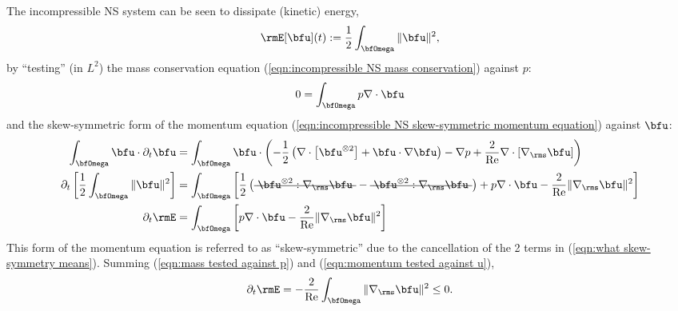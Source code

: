     The incompressible NS system can be seen to dissipate (kinetic) energy,
    \begin{equation}\label{eqn:incompressible NS energy definition}
        \rmE[\bfu](t)  :=  \frac{1}{2}\int_{\bfOmega}\|\bfu\|^{2},
    \end{equation}
    by ``testing'' (in $L^{2}$) the mass conservation equation (\ref{eqn:incompressible NS mass conservation}) against $p$:
    \begin{equation}\label{eqn:mass tested against p}
        0  =  \int_{\bfOmega}p\nabla\cdot\bfu
    \end{equation}
    and the skew-symmetric form of the momentum equation (\ref{eqn:incompressible NS skew-symmetric momentum equation}) against $\bfu$:
    \begin{align}
        \int_{\bfOmega}\bfu\cdot\partial_{t}\bfu  &=  \int_{\bfOmega}\bfu\cdot\left(- \frac{1}{2}\left(\nabla\cdot\left[\bfu^{\otimes 2}\right] + \bfu\cdot\nabla\bfu\right) - \nabla p + \frac{2}{\rmRe}\nabla\cdot[\nabla_{\rms}\bfu]\right)  \\
        \partial_{t}\left[\frac{1}{2}\int_{\bfOmega}\|\bfu\|^{2}\right]  &=  \int_{\bfOmega}\left[\frac{1}{2}\left(\mst{\bfu^{\otimes 2}:\nabla_{\rms}\bfu} - \mst{\bfu^{\otimes 2}:\nabla_{\rms}\bfu}\right) + p\nabla\cdot\bfu - \frac{2}{\rmRe}\|\nabla_{\rms}\bfu\|^{2}\right]  \label{eqn:what skew-symmetry means}  \\
        \partial_{t}\rmE  &=  \int_{\bfOmega}\left[p\nabla\cdot\bfu - \frac{2}{\rmRe}\|\nabla_{\rms}\bfu\|^{2}\right]  \label{eqn:momentum tested against u}
    \end{align}
    This form of the momentum equation is referred to as ``skew-symmetric'' due to the cancellation of the 2 terms in (\ref{eqn:what skew-symmetry means}). Summing (\ref{eqn:mass tested against p}) and (\ref{eqn:momentum tested against u}),
    \begin{equation}
        \partial_{t}\rmE  =  - \frac{2}{\rmRe}\int_{\bfOmega}\|\nabla_{\rms}\bfu\|^{2}  \leq  0.
    \end{equation}

